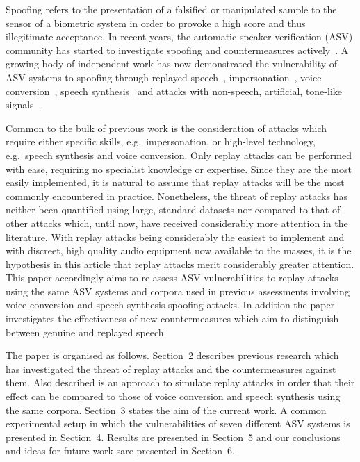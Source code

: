 

Spoofing refers to the presentation of a falsified or manipulated sample 
to the sensor of a biometric system in order to provoke a high score and 
thus illegitimate acceptance.
In recent years, the automatic speaker verification (ASV) community has 
started to investigate spoofing and countermeasures 
actively~\cite{interspeechSpecialSession, handbookChapter, specComJournal}. 
A growing 
body of independent work has now demonstrated the vulnerability of ASV 
systems to spoofing through 
replayed speech~\cite{Lindberg1999,Villalba2010},
impersonation~\cite{Blomberg2004,Farrus2008}, voice 
conversion~\cite{Perrot2005, Bonastre2007}, speech 
synthesis~\cite{Masuko1999, Leon2010} and attacks with non-speech, 
artificial, tone-like signals~\cite{Alegre2012b}.

Common to the bulk of previous work is the consideration of attacks 
which require either specific skills, e.g.~impersonation, or high-level 
technology, e.g.~speech synthesis and voice conversion. 
Only replay attacks can be performed with ease, requiring no specialist 
knowledge or expertise.  Since they are the most easily 
implemented, it is natural to assume that replay attacks will be the 
most commonly encountered in practice.  Nonetheless, the threat of 
replay attacks has neither been quantified using large, standard 
datasets nor compared to that of other attacks which, until now, have 
received considerably more attention in the literature.
With replay attacks being considerably the easiest to implement
and with discreet, high quality audio equipment now available to the masses,
it is the hypothesis in this article that replay attacks merit
considerably greater attention.
This paper accordingly aims to re-assess ASV vulnerabilities 
to replay attacks using the same ASV systems and corpora used in 
previous assessments involving voice conversion and speech synthesis 
spoofing attacks.  In addition the paper investigates the effectiveness of 
new countermeasures which aim to distinguish between genuine and replayed speech.  

The paper is organised as follows.  Section~2 describes previous research 
which has investigated the threat of replay attacks and the 
countermeasures against them.  Also described is an approach to 
simulate replay attacks in order that their effect can be compared to 
those of voice conversion and speech synthesis using the same corpora. 
Section~3 states the aim of the current work. A common experimental 
setup in which the vulnerabilities of seven different ASV systems is 
presented in Section~4. Results are presented in Section~5 and our 
conclusions and ideas for future work sare presented in Section~6.
